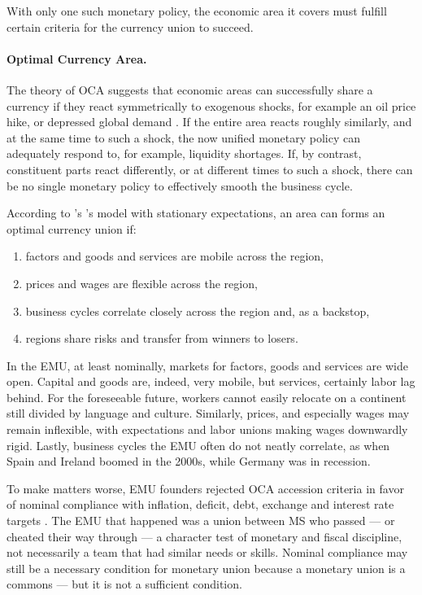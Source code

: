 With only one such monetary policy, the economic area it covers must fulfill certain criteria for the currency union to succeed.

\paragraph{Optimal Currency Area.}
	\label{sec:OCA}
The theory of \gls{OCA} suggests that economic areas can successfully share a currency if they react symmetrically to exogenous shocks, for example an oil price hike, or depressed global demand \citep{Mundell1961}.
If the entire area reacts roughly similarly, and at the same time to such a shock, the now unified monetary policy can adequately respond to, for example, liquidity shortages.
If, by contrast, constituent parts react differently, or at different times to such a shock, there can be no single monetary policy to effectively smooth the business cycle.

According to \citeauthor{Mundell1961}'s \citeyearpar{Mundell1961}'s  model with stationary expectations, an area can forms an optimal currency union if:
\begin{enumerate}
	\item factors and goods and services are mobile across the region,
	\item prices and wages are flexible across the region,
	\item business cycles correlate closely across the region and, as a backstop,
	\item regions share risks and transfer from winners to losers.
\end{enumerate}

In the \gls{EMU}, at least nominally, markets for factors, goods and services are wide open.
Capital and goods are, indeed, very mobile, but services, certainly labor lag behind.
For the foreseeable future, workers cannot easily relocate on a continent still divided by language and culture.
Similarly, prices, and especially wages may remain inflexible, with expectations and labor unions making wages downwardly rigid.
Lastly, business cycles the \gls{EMU} often do not neatly correlate, as when Spain and Ireland boomed in the 2000s, while Germany was in recession.

To make matters worse, \gls{EMU} founders rejected \gls{OCA} accession criteria in favor of nominal compliance with inflation, deficit, debt, exchange and interest rate targets \citep[4]{Begg2008}.
The \gls{EMU} that happened was a union between \gls{MS} who passed --- or cheated their way through --- a character test of monetary and fiscal discipline, not necessarily a team that had similar needs or skills.
Nominal compliance may still be a necessary condition for monetary union because a monetary union is a commons --- but it is not a sufficient condition.

